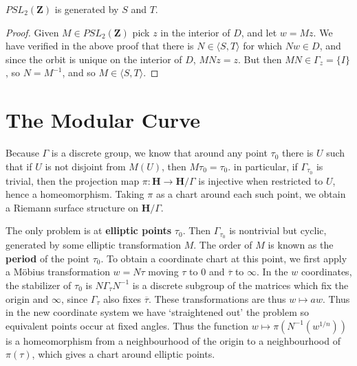 \begin{corollary}
    $PSL_2(\mathbf{Z})$ is generated by $S$ and $T$.
\end{corollary}
\begin{proof}
    Given $M \in PSL_2(\mathbf{Z})$ pick $z$ in the interior of $D$, and let $w = M z$. We have verified in the above proof that there is $N \in \langle S, T \rangle$ for which $Nw \in D$, and since the orbit is unique on the interior of $D$, $MNz = z$. But then $MN \in \Gamma_z = \{ I \}$, so $N = M^{-1}$, and so $M \in \langle S, T \rangle$.
\end{proof}

\section{The Modular Curve}

Because $\Gamma$ is a discrete group, we know that around any point $\tau_0$ there is $U$ such that if $U$ is not disjoint from $M(U)$, then $M\tau_0 = \tau_0$. in particular, if $\Gamma_{\tau_0}$ is trivial, then the projection map $\pi: \mathbf{H} \to \mathbf{H}/\Gamma$ is injective when restricted to $U$, hence a homeomorphism. Taking $\pi$ as a chart around each such point, we obtain a Riemann surface structure on $\mathbf{H}/\Gamma$.

The only problem is at {\bf elliptic points} $\tau_0$. Then $\Gamma_{\tau_0}$ is nontrivial but cyclic, generated by some elliptic transformation $M$. The order of $M$ is known as the {\bf period} of the point $\tau_0$. To obtain a coordinate chart at this point, we first apply a M\"{o}bius transformation $w = N\tau$ moving $\tau$ to 0 and $\overline{\tau}$ to $\infty$. In the $w$ coordinates, the stabilizer of $\tau_0$ is $N \Gamma_\tau N^{-1}$ is a discrete subgroup of the matrices which fix the origin and $\infty$, since $\Gamma_\tau$ also fixes $\overline{\tau}$. These transformations are thus $w \mapsto aw$. Thus in the new coordinate system we have `straightened out' the problem so equivalent points occur at fixed angles. Thus the function $w \mapsto \pi(N^{-1}(w^{1/n}))$ is a homeomorphism from a neighbourhood of the origin to a neighbourhood of $\pi(\tau)$, which gives a chart around elliptic points.

